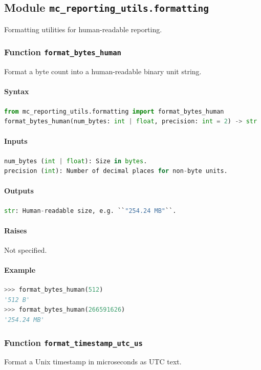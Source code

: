 \documentclass[11pt]{article}
\begin{document}
\subsection{Module \texttt{mc\_reporting\_utils.formatting}}
Formatting utilities for human-readable reporting.

\subsubsection{Function \texttt{format\_bytes\_human}}
Format a byte count into a human-readable binary unit string.

\paragraph{Syntax}
\begin{lstlisting}[language=Python]
from mc_reporting_utils.formatting import format_bytes_human
format_bytes_human(num_bytes: int | float, precision: int = 2) -> str
\end{lstlisting}
\paragraph{Inputs}
\begin{lstlisting}[language=Python]
num_bytes (int | float): Size in bytes.
precision (int): Number of decimal places for non-byte units.
\end{lstlisting}
\paragraph{Outputs}
\begin{lstlisting}[language=Python]
str: Human-readable size, e.g. ``"254.24 MB"``.
\end{lstlisting}
\paragraph{Raises}
Not specified.
\paragraph{Example}
\begin{lstlisting}[language=Python]
>>> format_bytes_human(512)
'512 B'
>>> format_bytes_human(266591626)
'254.24 MB'
\end{lstlisting}

\subsubsection{Function \texttt{format\_timestamp\_utc\_us}}
Format a Unix timestamp in microseconds as UTC text.
\end{document}

